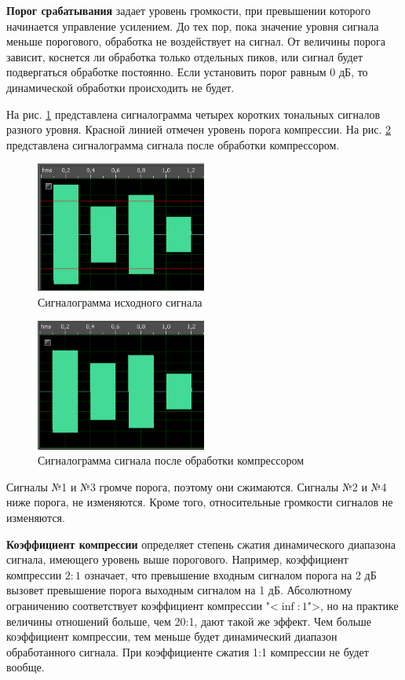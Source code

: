 \documentclass[oneside, final, 14pt]{extreport}
\begin{document}
\textbf{Порог срабатывания} задает уровень громкости, при превышении которого начинается управление усилением. До тех пор, пока значение уровня сигнала меньше порогового, обработка не воздействует на сигнал. От величины порога зависит, коснется ли обработка только отдельных пиков, или сигнал будет подвергаться обработке постоянно. Если установить порог равным $0$ дБ, то динамической обработки происходить не будет.

На рис. \ref{pic-compress-01} представлена сигналограмма четырех коротких тональных сигналов разного уровня. Красной линией отмечен уровень порога компрессии. На рис. \ref{pic-compress-02} представлена сигналограмма сигнала после обработки компрессором.

\begin{figure}[h!]
  \centering
  \includegraphics[width=0.5\textwidth]{pic-compress-01}
  \caption{Сигналограмма исходного сигнала}
  \label{pic-compress-01}
\end{figure}

\begin{figure}[h!]
  \centering
  \includegraphics[width=0.5\textwidth]{pic-compress-02}
  \caption{Сигналограмма сигнала после обработки компрессором}
  \label{pic-compress-02}
\end{figure}

Сигналы №1 и №3 громче порога, поэтому они сжимаются. Сигналы №2 и №4 ниже порога, не изменяются. Кроме того, относительные громкости сигналов не изменяются.

\textbf{Коэффициент компрессии} определяет степень сжатия динамического диапазона сигнала, имеющего уровень выше порогового.
Например, коэффициент компрессии $2:1$ означает, что превышение входным сигналом порога на 2 дБ вызовет превышение порога выходным сигналом на 1 дБ. Абсолютному ограничению соответствует коэффициент компрессии "<$\inf:1$">, но на практике величины отношений больше, чем 20:1, дают такой же эффект. Чем больше коэффициент компрессии, тем меньше будет динамический диапазон обработанного сигнала. При коэффициенте сжатия 1:1 компрессии не будет вообще.
\end{document}
